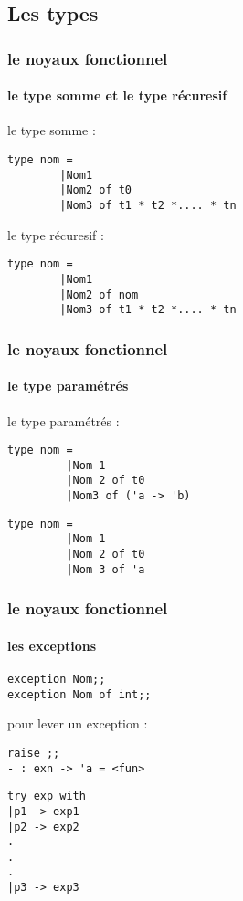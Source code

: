       \subsection{Les types}
\begin{frame}[fragile]
	\frametitle{le noyaux fonctionnel}
	\framesubtitle{le type somme et le type récuresif}
	le type somme :
	\begin{lstlisting}
type nom =
        |Nom1 
        |Nom2 of t0 
        |Nom3 of t1 * t2 *.... * tn 
	\end{lstlisting}
	le type récuresif :
	\begin{lstlisting}
type nom =
        |Nom1
        |Nom2 of nom
        |Nom3 of t1 * t2 *.... * tn
         \end{lstlisting}
\end{frame}

\begin{frame}[fragile]
  \frametitle{le noyaux fonctionnel}
  \framesubtitle{le type paramétrés}
  le type paramétrés :
  \begin{lstlisting}
type nom =
         |Nom 1
         |Nom 2 of t0
         |Nom3 of ('a -> 'b)
  \end{lstlisting}
  \begin{lstlisting}
type nom = 
         |Nom 1 
         |Nom 2 of t0
         |Nom 3 of 'a 
  \end{lstlisting}
\end{frame}

\begin{frame}[fragile]
  \frametitle{le noyaux fonctionnel}
  \framesubtitle{les exceptions}
  \begin{lstlisting}
exception Nom;;
exception Nom of int;;
  \end{lstlisting}
pour lever un exception : 
\begin{lstlisting}
raise ;;
- : exn -> 'a = <fun>
\end{lstlisting}
\begin{lstlisting}
try exp with 
|p1 -> exp1
|p2 -> exp2
.
.
.
|p3 -> exp3
\end{lstlisting}

\end{frame}
